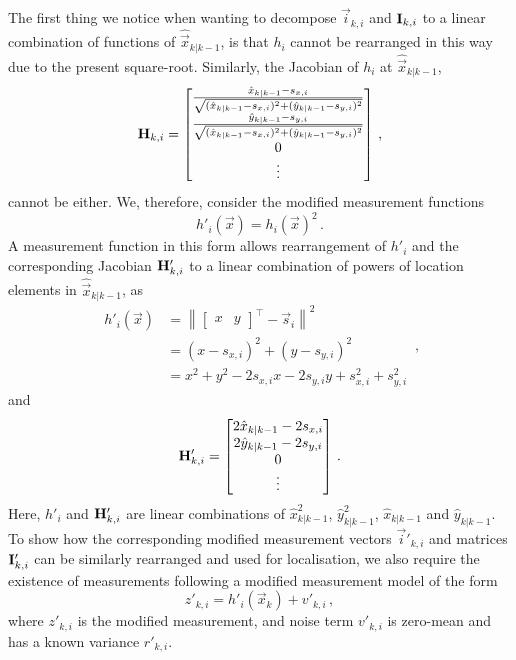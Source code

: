 \documentclass[10pt,letterpaper,oneside,twocolumn,journal]{IEEEtran}
\theoremstyle{definition}
\theoremstyle{definition}
\theoremstyle{remark}
\begin{document}
The first thing we notice when wanting to decompose $\vec{i}_{k,i}$ and ${{\mathbf{I}}}_{k,i}$ to a linear combination of functions of $\hat{\vec{x}}_{k|k-1}$, is that $h_i$ cannot be rearranged in this way due to the present square-root. Similarly, the Jacobian of $h_i$ at $\hat{\vec{x}}_{k|k-1}$,
\begin{equation}
    {\ensuremath{{\mathbf{H}}}}_{k,i} = 
    \begin{bmatrix}
        \frac{\hat{x}_{k|k-1} - s_{x,i}}{\sqrt{(\hat{x}_{k|k-1} - s_{x,i})^2 + (\hat{y}_{k|k-1} - s_{y,i})^2}} \\
        \frac{\hat{y}_{k|k-1} - s_{y,i}}{\sqrt{(\hat{x}_{k|k-1} - s_{x,i})^2 + (\hat{y}_{k|k-1} - s_{y,i})^2}} \\
        0 \\
        \vdots
    \end{bmatrix}\,,
\end{equation}
cannot be either. We, therefore, consider the modified measurement functions
\begin{equation}
    h'_i(\vec{x}) = h_i(\vec{x})^2\,. \label{eqn:modified_measurement_func}
\end{equation}
A measurement function in this form allows rearrangement of $h'_i$ and the corresponding Jacobian ${{\mathbf{H}}}'_{k,i}$ to a linear combination of powers of location elements in $\hat{\vec{x}}_{k|k-1}$, as
\begin{equation}
    \begin{split}
        h'_i(\vec{x}) &= \left\lVert
        \begin{bmatrix}
            x & y
        \end{bmatrix}^\top - \vec{s}_i\right\rVert^2 \\
        &= (x - s_{x,i})^2 + (y - s_{y,i})^2 \\
        &= x^2 + y^2 -2s_{x,i}x -2s_{y,i}y +s_{x,i}^2 +s_{y,i}^2
    \end{split}\,,
\end{equation}
and
\begin{equation}
    \mat{H}'_{k,i} = 
    \begin{bmatrix}
        2\hat{x}_{k|k-1} - 2s_{x,i} \\
        2\hat{y}_{k|k-1} - 2s_{y,i} \\
        0 \\
        \vdots
    \end{bmatrix}\,. \label{eqn:modified_jacobian}
\end{equation}
Here, $h'_i$ and ${{\mathbf{H}}}'_{k,i}$ are linear combinations of $\hat{x}_{k|k-1}^2$, $\hat{y}_{k|k-1}^2$, $\hat{x}_{k|k-1}$ and $\hat{y}_{k|k-1}$. To show how the corresponding modified measurement vectors $\vec{i}'_{k,i}$ and matrices ${{\mathbf{I}}}'_{k,i}$ can be similarly rearranged and used for localisation, we also require the existence of measurements following a modified measurement model of the form
\begin{equation}
    z'_{k,i} = h'_i(\vec{x}_k)+v'_{k,i}\,, \label{eqn:modified_measurement_model}
\end{equation}
where $z'_{k,i}$ is the modified measurement, and noise term $v'_{k,i}$ is zero-mean and has a known variance $r'_{k,i}$.
\end{document}
